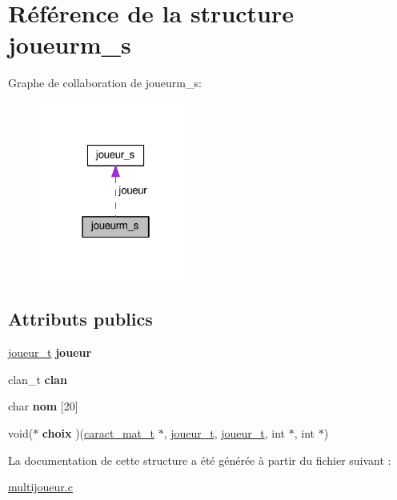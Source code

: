 \hypertarget{structjoueurm__s}{}\section{Référence de la structure joueurm\+\_\+s}
\label{structjoueurm__s}


Graphe de collaboration de joueurm\+\_\+s\+:
\nopagebreak
\begin{figure}[H]
\begin{center}
\leavevmode
\includegraphics[width=142pt]{structjoueurm__s__coll__graph}
\end{center}
\end{figure}
\subsection*{Attributs publics}
\begin{DoxyCompactItemize}
\item 
\hyperlink{structjoueur__s}{joueur\+\_\+t} {\bfseries joueur}\hypertarget{structjoueurm__s_adb23e424b4149c57a0a67ec8cf2d9c79}{}\label{structjoueurm__s_adb23e424b4149c57a0a67ec8cf2d9c79}

\item 
clan\+\_\+t {\bfseries clan}\hypertarget{structjoueurm__s_ad121cc6e2377bdc011889472c18bc094}{}\label{structjoueurm__s_ad121cc6e2377bdc011889472c18bc094}

\item 
char {\bfseries nom} \mbox{[}20\mbox{]}\hypertarget{structjoueurm__s_afefb62cb34b9cd50ae51836fcc048e91}{}\label{structjoueurm__s_afefb62cb34b9cd50ae51836fcc048e91}

\item 
void($\ast$ {\bfseries choix} )(\hyperlink{structcaract__mat__t}{caract\+\_\+mat\+\_\+t} $\ast$, \hyperlink{structjoueur__s}{joueur\+\_\+t}, \hyperlink{structjoueur__s}{joueur\+\_\+t}, int $\ast$, int $\ast$)\hypertarget{structjoueurm__s_ac2defe2197df24739045018153269044}{}\label{structjoueurm__s_ac2defe2197df24739045018153269044}

\end{DoxyCompactItemize}


La documentation de cette structure a été générée à partir du fichier suivant \+:\begin{DoxyCompactItemize}
\item 
\hyperlink{multijoueur_8c}{multijoueur.\+c}\end{DoxyCompactItemize}
